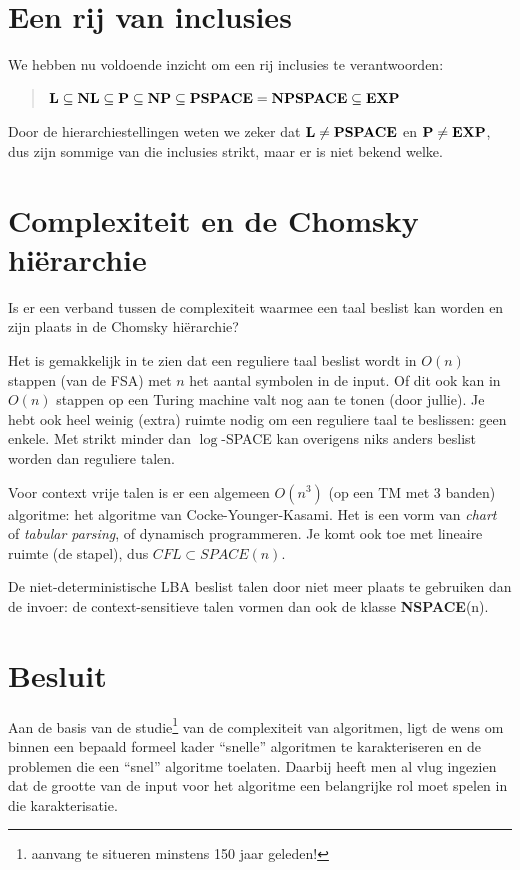 \section{Een rij van inclusies}

We hebben nu voldoende inzicht om een rij inclusies te verantwoorden:

\begin{verse}
${\bf L} \subseteq {\bf NL} \subseteq {\bf P} \subseteq {\bf NP} \subseteq {\bf PSPACE} = {\bf NPSPACE} \subseteq {\bf EXP}$
\end{verse}

Door de hierarchiestellingen weten we zeker dat ${\bf L} \neq {\bf PSPACE}$ en
${\bf P} \neq {\bf EXP}$, dus zijn sommige van die inclusies strikt, maar er is
niet bekend welke.


\section{Complexiteit en de Chomsky hi\"erarchie}

Is er een verband tussen de complexiteit waarmee een taal beslist kan
worden en zijn plaats in de Chomsky hi\"{e}rarchie?

Het is gemakkelijk in te zien dat een reguliere taal beslist wordt in
$O(n)$ stappen (van de FSA) met $n$ het aantal symbolen in de
input. Of dit ook kan in $O(n)$ stappen op een Turing machine valt nog
aan te tonen (door jullie). Je hebt ook heel weinig (extra) ruimte
nodig om een reguliere taal te beslissen: geen enkele. Met strikt
minder dan $\log$-SPACE kan overigens niks anders beslist worden dan
reguliere talen.

Voor context vrije talen is er een algemeen $O(n^3)$ (op een TM met 3
banden) algoritme: het algoritme van Cocke-Younger-Kasami. Het is een
vorm van {\em chart} of {\em tabular parsing}, of dynamisch
programmeren. Je komt ook toe met lineaire ruimte (de stapel), dus
$CFL \subset SPACE(n)$.

De niet-deterministische LBA beslist talen door niet meer plaats te
gebruiken dan de invoer: de context-sensitieve talen vormen dan ook de
klasse {\bf NSPACE}(n).


\section{Besluit}
Aan de basis van de studie\footnote{aanvang te situeren minstens 150
  jaar geleden!} van de complexiteit van algoritmen, ligt de wens om
binnen een bepaald formeel kader ``snelle'' algoritmen te
karakteriseren en de problemen die een ``snel'' algoritme
toelaten. Daarbij heeft men al vlug ingezien dat de grootte van de
input voor het algoritme een belangrijke rol moet spelen in die
karakterisatie.

